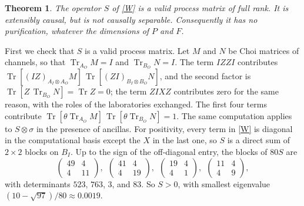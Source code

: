 \documentclass[aps,prl,reprint,superscriptaddress,nofootinbib,longbibliography,raggedbottom]{revtex4-2}
\DeclareMathOperator{\Tr}{Tr}
\newtheorem*{theorem*}{Theorem}
\begin{document}
\begin{theorem*}
The operator $S$ of \eqref{W} is a valid process matrix of full rank. It is
extensibly causal, but is not causally separable. Consequently it has no
purification, whatever the dimensions of $P$ and $F$.
\end{theorem*}

First we check that $S$ is a valid process matrix. Let $M$ and $N$ be Choi
matrices of channels, so that $\Tr_{A_O}M=I$ and $\Tr_{B_O}N=I$. The term
$IZZI$ contributes $\Tr[(IZ)_{A_I \otimes A_O}M]\,\allowbreak\Tr[(ZI)_{B_I \otimes B_O}N]$, and the second factor is
$\Tr[Z\,\Tr_{B_O}N]=\Tr Z=0$; the term $ZIXZ$ contributes zero for the same
reason, with the roles of the laboratories exchanged. The first four terms
contribute $\Tr[\theta\Tr_{A_O}M]\,\Tr[\theta\Tr_{B_O}N]=1$. The same
computation applies to $S\otimes\sigma$ in the presence of ancillas. For
positivity, every term in \eqref{W} is diagonal in the computational basis
except the $X$ in the last one, so $S$ is a direct sum of $2\times2$ blocks
on $B_I$. Up to the sign of the
off-diagonal entry, the blocks of $80S$ are
\begin{equation}\label{blocks}
\begin{pmatrix}49&4\\4&11\end{pmatrix},\ \
\begin{pmatrix}41&4\\4&19\end{pmatrix},\ \
\begin{pmatrix}19&4\\4&1\end{pmatrix},\ \
\begin{pmatrix}11&4\\4&9\end{pmatrix},
\end{equation}
with determinants $523$, $763$, $3$, and $83$. So $S>0$, with smallest
eigenvalue $(10-\sqrt{97})/80\approx0.0019$.

\medskip
\end{document}
